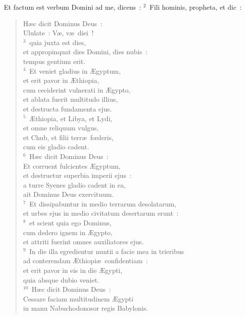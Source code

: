 \bchapter
\lettrine[lines=3,image=true,loversize=0.05,lraise=-0.03]{E}{}t factum est verbum Domini ad me, dicens~:
${}^{2}$~Fili hominis, propheta, et dic~: \begin{flushleft}\begin{verse}H\ae c dicit Dominus Deus~:\\ Ululate~: V\ae , v\ae\ diei~!\\
${}^{3}$~quia juxta est dies,\\ et appropinquat dies Domini, dies nubis~:\\ tempus gentium erit.\\
${}^{4}$~Et veniet gladius in \AE gyptum,\\ et erit pavor in \AE thiopia,\\ cum ceciderint vulnerati in \AE gypto,\\ et ablata fuerit multitudo illius,\\ et destructa fundamenta ejus.\\
${}^{5}$~\AE thiopia, et Libya, et Lydi,\\ et omne reliquum vulgus,\\ et Chub, et filii terr\ae\ fœderis,\\ cum eis gladio cadent.\\
${}^{6}$~H\ae c dicit Dominus Deus~:\\ Et corruent fulcientes \AE gyptum,\\ et destruetur superbia imperii ejus~:\\ a turre Syenes gladio cadent in ea,\\ ait Dominus Deus exercituum.\\
${}^{7}$~Et dissipabuntur in medio terrarum desolatarum,\\ et urbes ejus in medio civitatum desertarum erunt~:\\
${}^{8}$~et scient quia ego Dominus,\\ cum dedero ignem in \AE gypto,\\ et attriti fuerint omnes auxiliatores ejus.\\
${}^{9}$~In die illa egredientur nuntii a facie mea in trieribus\\ ad conterendam \AE thiopi\ae\ confidentiam~:\\ et erit pavor in eis in die \AE gypti,\\ quia absque dubio veniet.\\
${}^{10}$~H\ae c dicit Dominus Deus~:\\ Cessare faciam multitudinem \AE gypti\\ in manu Nabuchodonosor regis Babylonis.\\

\end{verse}
\end{flushleft}
